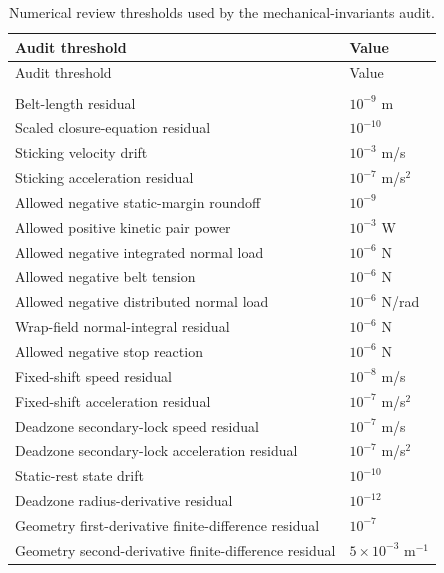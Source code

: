 \documentclass[11pt]{report}
\numberwithin{equation}{section}
\begin{document}
\begin{center}
\small
\setlength{\LTleft}{0pt}
\setlength{\LTright}{0pt}
\begin{longtable}{@{}>{\raggedright\arraybackslash}p{}>{\raggedleft\arraybackslash}p{}@{}}
\toprule
Audit threshold & Value \\ \midrule
\endfirsthead
\toprule
Audit threshold & Value \\ \midrule
\endhead
\bottomrule
\endfoot
\bottomrule
\caption{Numerical review thresholds used by the mechanical-invariants audit.}
\label{tab:invariants_review_guards}\\
\endlastfoot
Belt-length residual & $10^{-9}$ m \\
Scaled closure-equation residual & $10^{-10}$ \\
Sticking velocity drift & $10^{-3}$ m/s \\
Sticking acceleration residual & $10^{-7}$ m/s$^2$ \\
Allowed negative static-margin roundoff & $10^{-9}$ \\
Allowed positive kinetic pair power & $10^{-3}$ W \\
Allowed negative integrated normal load & $10^{-6}$ N \\
Allowed negative belt tension & $10^{-6}$ N \\
Allowed negative distributed normal load & $10^{-6}$ N/rad \\
Wrap-field normal-integral residual & $10^{-6}$ N \\
Allowed negative stop reaction & $10^{-6}$ N \\
Fixed-shift speed residual & $10^{-8}$ m/s \\
Fixed-shift acceleration residual & $10^{-7}$ m/s$^2$ \\
Deadzone secondary-lock speed residual & $10^{-7}$ m/s \\
Deadzone secondary-lock acceleration residual & $10^{-7}$ m/s$^2$ \\
Static-rest state drift & $10^{-10}$ \\
Deadzone radius-derivative residual & $10^{-12}$ \\
Geometry first-derivative finite-difference residual & $10^{-7}$ \\
Geometry second-derivative finite-difference residual & $5\times10^{-3}$ m$^{-1}$ \\
\end{longtable}
\normalsize
\end{center}
\end{document}
